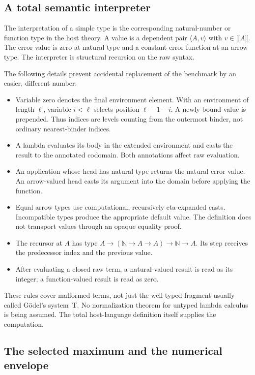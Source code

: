 \documentclass[11pt,letterpaper]{article}
\theoremstyle{definition}
\newcommand{\N}{\mathbb N}
\newcommand{\llbracket}{\mathopen{[\![}}
\newcommand{\rrbracket}{\mathclose{]\!]}}
\begin{document}
\subsection{A total semantic interpreter}

The interpretation of a simple type is the corresponding natural-number or
function type in the host theory. A value is a dependent pair
\(\langle A,v\rangle\) with \(v\in\llbracket A\rrbracket\).
The error value is zero at natural type and a constant error function at an
arrow type. The interpreter is structural recursion on the raw syntax.

The following details prevent accidental replacement of the benchmark by an
easier, different number:
\begin{itemize}
\item Variable zero denotes the final environment element. With an environment
      of length \(\ell\), variable \(i<\ell\) selects position
      \(\ell-1-i\). A newly bound value is prepended. Thus indices are levels
      counting from the outermost binder, not ordinary nearest-binder indices.
\item A lambda evaluates its body in the extended environment and casts the
      result to the annotated codomain. Both annotations affect raw evaluation.
\item An application whose head has natural type returns the natural error
      value. An arrow-valued head casts its argument into the domain before
      applying the function.
\item Equal arrow types use computational, recursively eta-expanded casts.
      Incompatible types produce the appropriate default value. The definition
      does not transport values through an opaque equality proof.
\item The recursor at \(A\) has type
      \(A\to(\N\to A\to A)\to\N\to A\). Its step receives the predecessor
      index and the previous value.
\item After evaluating a closed raw term, a natural-valued result is read as
      its integer; a function-valued result is read as zero.
\end{itemize}

These rules cover malformed terms, not just the well-typed fragment usually
called G\"odel's system~T. No normalization theorem for untyped lambda calculus
is being assumed. The total host-language definition itself supplies the
computation.

\subsection{The selected maximum and the numerical envelope}
\end{document}
